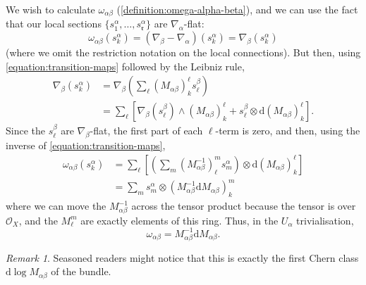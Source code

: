 \documentclass[11pt,fleqn]{article}
\theoremstyle{plain}
\theoremstyle{definition}
\theoremstyle{remark}
\newtheorem{remark}[theorem]{Remark}
\numberwithin{equation}{theorem}
\newcommand{\OO}{\mathcal{O}}
\renewcommand{\d}{\mathrm{d}}
\begin{document}
        We wish to calculate $\omega_{\alpha\beta}$ (\cref{definition:omega-alpha-beta}), and we can use the fact that our local sections $\{s_1^\alpha,\ldots,s_\mathfrak{r}^\alpha\}$ are $\nabla_\alpha$-flat:
        \[
            \omega_{\alpha\beta} \left(s_k^\alpha\right)
            =
            \left(\nabla_\beta-\nabla_\alpha\right) \left(s_k^\alpha\right)
            =
            \nabla_\beta \left(s_k^\alpha\right)
        \]
        (where we omit the restriction notation on the local connections).
        But then, using \cref{equation:transition-maps} followed by the Leibniz rule,
        \begin{align*}
            \nabla_\beta\left(s^\alpha_k\right) &= \nabla_\beta\left(\sum_\ell(M_{\alpha\beta})_k^\ell s^\beta_\ell\right)\\
            &=\sum_\ell\left[\nabla_\beta\left(s^\beta_\ell\right)\wedge(M_{\alpha\beta})^\ell_k+s^\beta_\ell\otimes\d(M_{\alpha\beta})^\ell_k\right].
        \end{align*}
        Since the $s^\beta_\ell$ are $\nabla_\beta$-flat, the first part of each $\ell$-term is zero, and then, using the inverse of \cref{equation:transition-maps},
        \begin{align*}
            \omega_{\alpha\beta}\left(s^\alpha_k\right) &= \sum_\ell\left[\left(\sum_m(M_{\alpha\beta}^{-1})^m_\ell s^\alpha_m\right)\otimes\d(M_{\alpha\beta})^\ell_k\right]\\
            &=\sum_m s^\alpha_m\otimes(M_{\alpha\beta}^{-1}\d M_{\alpha\beta})^m_k
        \end{align*}
        where we can move the $M_{\alpha\beta}^{-1}$ across the tensor product because the tensor is over $\OO_X$, and the $M_\ell^m$ are exactly elements of this ring.
        Thus, in the $U_\alpha$ trivialisation,
        \begin{equation}
        \label{equation:omega-alpha-beta-explicitly}
            \omega_{\alpha\beta}
            =
            M_{\alpha\beta}^{-1}\d M_{\alpha\beta}.
        \end{equation}

        \begin{remark}
            Seasoned readers might notice that this is exactly the first Chern class $\d\log M_{\alpha\beta}$ of the bundle.
        \end{remark}
\end{document}
